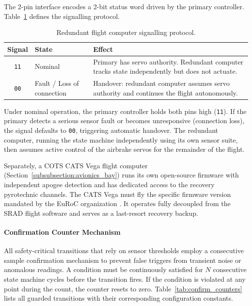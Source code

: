 The 2-pin interface encodes a 2-bit status word driven by the primary controller. Table~\ref{tab:redundancy_signals} defines the signalling protocol.

\begin{table}[H]
\centering
\caption{Redundant flight computer signalling protocol.}
\label{tab:redundancy_signals}
\begin{tabularx}{\textwidth}{c l X}
\toprule
\textbf{Signal} & \textbf{State} & \textbf{Effect} \\
\midrule
\texttt{11} & Nominal & Primary has servo authority. Redundant computer tracks state independently but does not actuate. \\
\addlinespace
\texttt{00} & Fault / Loss of connection & Handover: redundant computer assumes servo authority and continues the flight autonomously. \\
\bottomrule
\end{tabularx}
\end{table}

Under nominal operation, the primary controller holds both pins high (\texttt{11}). If the primary detects a serious sensor fault or becomes unresponsive (connection loss), the signal defaults to \texttt{00}, triggering automatic handover. The redundant computer, running the state machine independently using its own sensor suite, then assumes active control of the airbrake servos for the remainder of the flight.

Separately, a COTS CATS Vega flight computer (Section~\ref{subsubsection:avionics_bay}) runs its own open-source firmware with independent apogee detection and has dedicated access to the recovery pyrotechnic channels. The CATS Vega must fly the specific firmware version mandated by the EuRoC organization . It operates fully decoupled from the SRAD flight software and serves as a last-resort recovery backup.

\paragraph{Confirmation Counter Mechanism}

All safety-critical transitions that rely on sensor thresholds employ a consecutive sample confirmation mechanism to prevent false triggers from transient noise or anomalous readings. A condition must be continuously satisfied for $N$ consecutive state machine cycles before the transition fires. If the condition is violated at any point during the count, the counter resets to zero. Table~\ref{tab:confirm_counters} lists all guarded transitions with their corresponding configuration constants.

